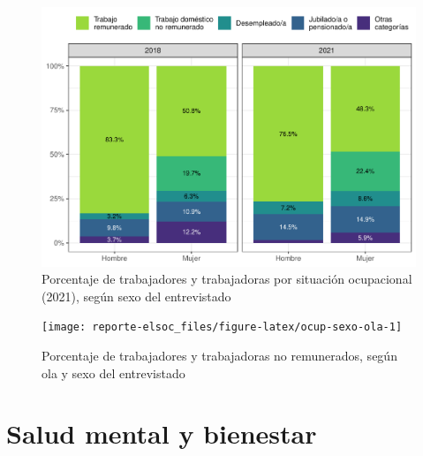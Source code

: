 \documentclass[
  12pt,
  openany]{book}
\begin{document}
\begin{figure}

{\centering \includegraphics{reporte-elsoc_files/figure-latex/ocup-sexo-1} 

}

\caption{Porcentaje de trabajadores y trabajadoras por situación ocupacional (2021), según sexo del entrevistado}\label{fig:ocup-sexo}
\end{figure}

\begin{figure}

{\centering \texttt{[image: reporte-elsoc\_files/figure-latex/ocup-sexo-ola-1]} 

}

\caption{Porcentaje de trabajadores y trabajadoras no remunerados, según ola y sexo del entrevistado}\label{fig:ocup-sexo-ola}
\end{figure}

\hypertarget{salud-mental-y-bienestar}{%
\chapter{Salud mental y bienestar}\label{salud-mental-y-bienestar}}
\end{document}
